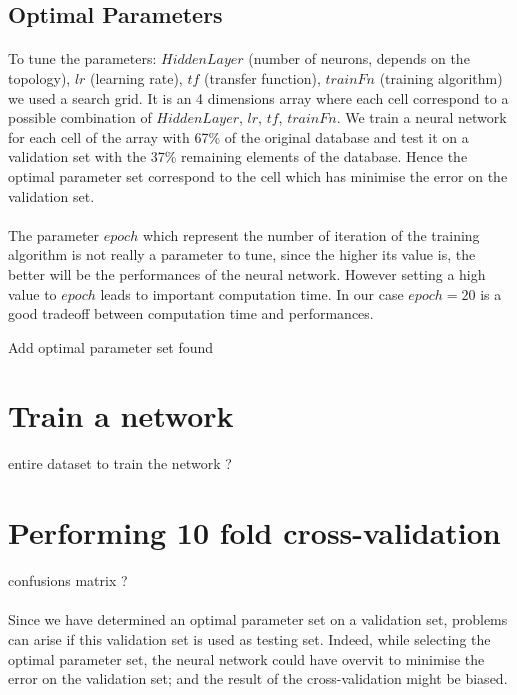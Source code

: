 \documentclass[a4paper,12pt,oneside,final]{report}
\begin{document}
\subsection{Optimal Parameters}
\label{ch:opset}
\paragraph{}
To tune the parameters: $HiddenLayer$ (number of neurons, depends on the topology), $lr$ (learning rate), $tf$ (transfer function), $trainFn$ (training algorithm) we used a search grid. It is an 4 dimensions array where each cell correspond to a possible combination of $HiddenLayer$, $lr$, $tf$, $trainFn$. We train a neural network for each cell of the array with 67\% of the original database and test it on a validation set with the 37\% remaining elements of the database. Hence the optimal parameter set correspond to the cell which has minimise the error on the validation set.
\paragraph{}
The parameter $epoch$ which represent the number of iteration of the training algorithm is not really a parameter to tune, since the higher its value is, the better will be the performances of the neural network. However setting a high value to $epoch$ leads to important computation time. In our case $epoch=20$ is a good tradeoff between computation time and performances.

{\color{red} Add optimal parameter set found}

\section{Train a network}
{\color{red} entire dataset to train the network ?}

\section{Performing 10 fold cross-validation}
{\color{red} confusions matrix ?}

\paragraph{}
Since we have determined an optimal parameter set on a validation set, problems can arise if this validation set is used as testing set. Indeed, while selecting the optimal parameter set, the neural network could have overvit to minimise the error on the validation set; and the result of the cross-validation might be biased.
\end{document}
